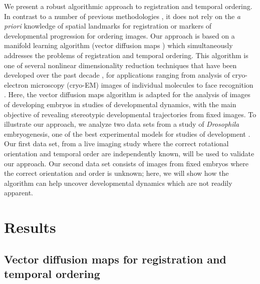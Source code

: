 \documentclass{pnastwo}
\begin{document}
\begin{article}
We present a robust algorithmic approach to registration and temporal ordering.
%
In contrast to a number of previous methodologies \cite{zitova2003image, rowley1998rotation, hajnal2010medical, greenspan1994rotation, zhao2003face}, it does not rely on the {\em a priori} knowledge of spatial landmarks for registration or markers of developmental progression for ordering images.
%
Our approach is based on a manifold learning algorithm (vector diffusion maps \cite{singer2012vector}) which simultaneously addresses the problems of registration and temporal ordering. 
%
This algorithm is one of several nonlinear dimensionality reduction techniques that have been developed over the past decade \cite{Belkin2003, coifman2005geometric, coifman2006geometric, tenenbaum2000global, roweis2000nonlinear}, for
applications ranging from analysis of cryo-electron microscopy (cryo-EM) images of individual molecules  \cite{zhao2014rotationally, singer2011viewing} to face recognition \cite{lafon2006data}.
%
Here, the vector diffusion maps algorithm is adapted for the analysis of images of developing embryos in studies of developmental dynamics, with the main objective of revealing stereotypic developmental trajectories from fixed images.
%
To illustrate our approach, we analyze two data sets from a study of {\it Drosophila} embryogenesis, one of the best experimental models for studies of development \cite{jaeger2012drosophila}.
%
Our first data set, from a live imaging study where the correct rotational orientation and temporal order are independently known, will be used to validate our approach.
%
Our second data set consists of images from fixed embryos where the correct orientation and order is unknown; here, we will show how the algorithm can help uncover developmental dynamics which are not readily apparent. 


\section{Results}

\subsection{Vector diffusion maps for registration and temporal ordering}


\end{article}
\end{document}
